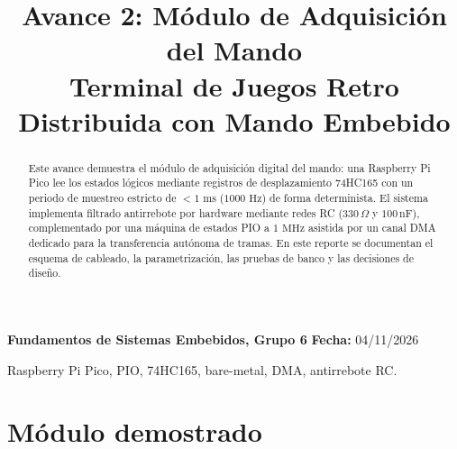 \documentclass[conference]{IEEEtran}
\begin{document}
\title{Avance 2: Módulo de Adquisición del Mando \\
    \large Terminal de Juegos Retro Distribuida con Mando Embebido}

\author{
    \and
    \and
    \and
    \and
    \and
}

\maketitle

\begin{center}
    \vspace{-0.3cm}
    {\small \textbf{Fundamentos de Sistemas Embebidos, Grupo 6} \quad
    \textbf{Fecha:} 04/11/2026}
\end{center}

\begin{abstract}
Este avance demuestra el módulo de adquisición digital del mando: una Raspberry Pi Pico lee los estados lógicos mediante registros de desplazamiento 74HC165 con un periodo de muestreo estricto de $<1\text{ ms}$ ($1000\text{ Hz}$) de forma determinista. El sistema implementa filtrado antirrebote por hardware mediante redes RC ($330\,\Omega$ y $100\,\text{nF}$), complementado por una máquina de estados PIO a $1\text{ MHz}$ asistida por un canal DMA dedicado para la transferencia autónoma de tramas. En este reporte se documentan el esquema de cableado, la parametrización, las pruebas de banco y las decisiones de diseño.
\end{abstract}

\begin{IEEEkeywords}
Raspberry Pi Pico, PIO, 74HC165, bare-metal, DMA, antirrebote RC.
\end{IEEEkeywords}

\section{Módulo demostrado}
\end{document}
